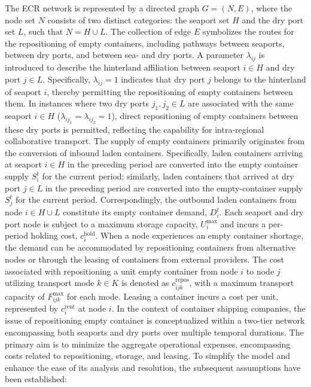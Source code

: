 \documentclass[preprint,12pt]{elsarticle}
\begin{document}
The ECR network is represented by a directed graph $G=\left(N,E\right)$, where the node set $N$ consists of two distinct categories: the seaport set $H$ and the dry port set $L$, such that $N=H\cup L$. The collection of edge $E$ symbolizes the routes for the repositioning of empty containers, including pathways between seaports, between dry ports, and between sea- and dry ports. A parameter $\lambda_{ij}$ is introduced to describe the hinterland affiliation between seaport $i\in H$ and dry port $j\in L$. Specifically, $\lambda_{ij}=1$ indicates that dry port $j$ belongs to the hinterland of seaport $i$, thereby permitting the repositioning of empty containers between them. In instances where two dry ports $j_1,j_2\in L$ are associated with the same seaport $i\in H$ ($\lambda_{ij_1}=\lambda_{ij_2}=1$), direct repositioning of empty containers between these dry ports is permitted, reflecting the capability for intra-regional collaborative transport. The supply of empty containers primarily originates from the conversion of inbound laden containers. Specifically, laden containers arriving at seaport $i\in H$ in the preceding period are converted into the empty container supply $S_i^t$ for the current period; similarly, laden containers that arrived at dry port $j\in L$ in the preceding period are converted into the empty-container supply $S_j^t$ for the current period. Correspondingly, the outbound laden containers from node $i\in H\cup L$ constitute its empty container demand, $D_i^t$. Each seaport and dry port node is subject to a maximum storage capacity, $U_i^{\max}$ and incurs a per-period holding cost, $c_i^\text{hold}$. When a node experiences an empty container shortage, the demand can be accommodated by repositioning containers from alternative nodes or through the leasing of containers from external providers. The cost associated with repositioning a unit empty container from node $i$ to node $j$ utilizing transport mode $k\in K$ is denoted as $c_{ijk}^\text{repos}$, with a maximum transport capacity of $F_{ijk}^{\max}$ for each mode. Leasing a container incurs a cost per unit, represented by $c_i^\text{rent}$ at node $i$.
In the context of container shipping companies, the issue of repositioning empty container is conceptualized within a two-tier network encompassing both seaports and dry ports over multiple temporal durations. The primary aim is to minimize the aggregate operational expenses, encompassing costs related to repositioning, storage, and leasing. To simplify the model and enhance the ease of its analysis and resolution, the subsequent assumptions have been established:
\end{document}
